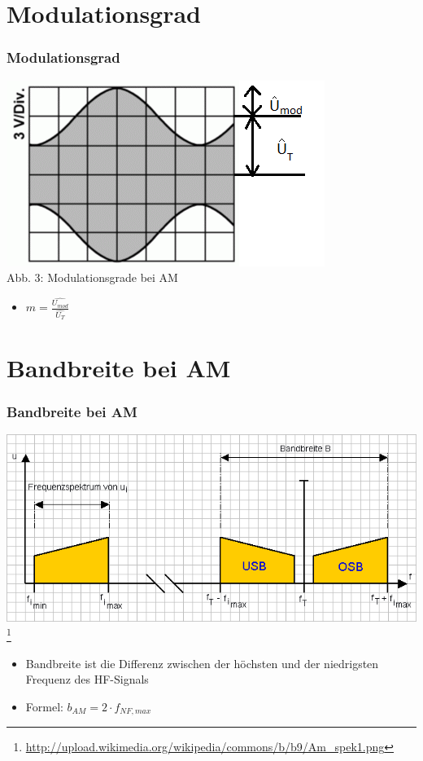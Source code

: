 \section*{Modulationsgrad}
\begin{frame}
\frametitle{Modulationsgrad}
\begin{center}
\includegraphics[scale=0.8]{e14/TE103.png}\\
Abb. 3: Modulationsgrade bei AM

\hspace{0.5cm}

\begin{itemize}
	\item	\LARGE{$m = \frac{\hat{U_{mod}}}{\hat{U_T}}$}
\end{itemize}
\end{center}
\end{frame}

\section*{Bandbreite bei AM}
\begin{frame}
\frametitle{Bandbreite bei AM}
\begin{center}
\includegraphics[scale=0.4]{e14/Bandbreite.png}\\
\footnote{\url{http://upload.wikimedia.org/wikipedia/commons/b/b9/Am_spek1.png}}
	\begin{itemize}
		\item Bandbreite ist die Differenz zwischen der höchsten und der niedrigsten Frequenz des HF-Signals
		\item Formel: \LARGE{$b_{AM} = 2 \cdot f_{NF,max}$}
	\end{itemize}
\end{center}
\end{frame}

